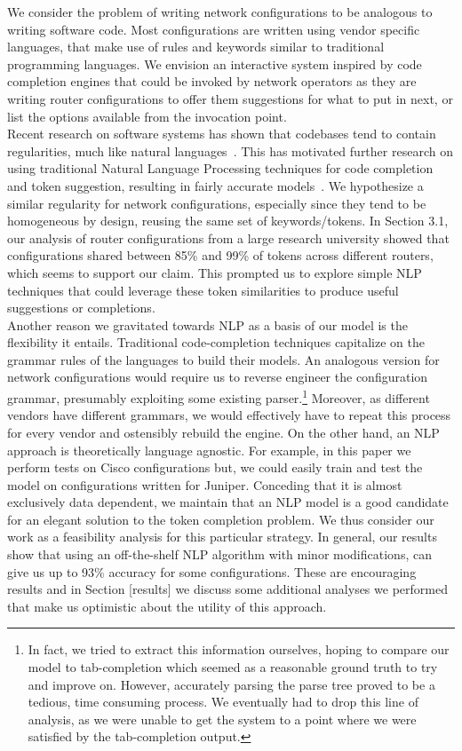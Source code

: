 We consider the problem of writing network configurations to be analogous to writing software code. Most configurations are written using vendor specific languages, that make use of rules and keywords similar to traditional programming languages. We envision an interactive system inspired by code completion engines that could be invoked by network operators as they are writing router configurations to offer them suggestions for what to put in next, or list the options available from the invocation point.\\

Recent research on software systems has shown that codebases tend to contain regularities, much like natural languages~\cite{naturalness}. This has motivated further research on using traditional Natural Language Processing techniques for code completion and token suggestion, resulting in fairly accurate models~\cite{naturalness, raychev}. We hypothesize a similar regularity for network configurations, especially since they tend to be homogeneous by design, reusing the same set of keywords/tokens. In Section 3.1, our analysis of router configurations from a large research university showed that configurations shared between 85\% and 99\% of tokens across different routers, which seems to support our claim. This prompted us to explore simple NLP techniques that could leverage these token similarities to produce useful suggestions or completions.\\

Another reason we gravitated towards NLP as a basis of our model is the flexibility it entails. Traditional code-completion techniques capitalize on the grammar rules of the languages to build their models. An analogous version for network configurations would require us to reverse engineer the configuration grammar, presumably exploiting some existing parser.\footnote{In fact, we tried to extract this information ourselves, hoping to compare our model to tab-completion which seemed as a reasonable ground truth to try and improve on. However, accurately parsing the parse tree proved to be a tedious, time consuming process. We eventually had to drop this line of analysis, as we were unable to get the system to a point where we were satisfied by the tab-completion output.}
Moreover, as different vendors have different grammars, we would effectively have to repeat this process for every vendor and ostensibly rebuild the engine. On the other hand, an NLP approach is theoretically language agnostic. For example, in this paper we perform tests on Cisco configurations but, we could easily train and test the model on configurations written for Juniper. Conceding that it is almost exclusively data dependent, we maintain that an NLP model is a good candidate for an elegant solution to the token completion problem. We thus consider our work as a feasibility analysis for this particular strategy. In general, our results show that using an off-the-shelf NLP algorithm with minor modifications, can give us up to 93\% accuracy for some configurations. These are encouraging results and in Section [results] we discuss some additional analyses we performed that make us optimistic about the utility of this approach.\\

